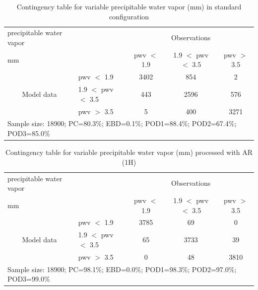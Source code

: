 \documentclass[a4paper,english]{article}
\begin{document}
\begin{table}[]
\begin{center}
\begin{tabular}{llccc}
\hline
{precipitable water vapor}                                       &                                                    & \multicolumn{3}{c}{Observations}                 \\
{mm}                                       &                             & pwv $<$ 1.9   & 1.9 $<$ pwv $<$ 3.5 & pwv $>$ 3.5 \\
\hline
\multicolumn{1}{c}{\multirow{3}{*}{Model data}}  & pwv $<$ 1.9             & 3402                & 854                       & 2              \\
                                                 & 1.9  $<$ pwv $<$ 3.5 & 443                & 2596                       & 576              \\
                                                 & pwv $>$ 3.5             & 5                & 400                       & 3271              \\
\hline
\multicolumn{5}{l}{Sample size: 18900; PC=80.3\%; EBD=0.1\%; POD1=88.4\%; POD2=67.4\%; POD3=85.0\%}                 \\
\end{tabular}
\end{center}
\caption{Contingency table for variable precipitable water vapor (mm) in standard configuration}
\label{tab:contingencypwvBEF}
\end{table}
\begin{table}[]
\begin{center}
\begin{tabular}{llccc}
\hline
{precipitable water vapor}                                       &                                                    & \multicolumn{3}{c}{Observations}                 \\
{mm}                                       &                             & pwv $<$ 1.9   & 1.9 $<$ pwv $<$ 3.5 & pwv $>$ 3.5 \\
\hline
\multicolumn{1}{c}{\multirow{3}{*}{Model data}}  & pwv $<$ 1.9             & 3785                & 69                       & 0              \\
                                                 & 1.9  $<$ pwv $<$ 3.5 & 65                & 3733                       & 39              \\
                                                 & pwv $>$ 3.5             & 0                & 48                       & 3810              \\
\hline 
\multicolumn{5}{l}{Sample size: 18900; PC=98.1\%; EBD=0.0\%; POD1=98.3\%; POD2=97.0\%; POD3=99.0\%}
\end{tabular}
\end{center}
\caption{Contingency table for variable precipitable water vapor (mm) processed with AR (1H)}
\label{tab:contingencypwvAFT}
\end{table}
\end{document}
